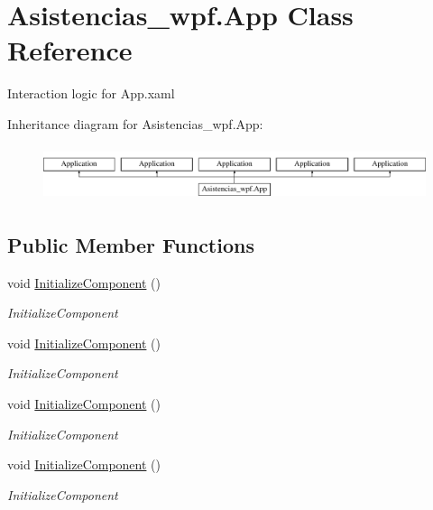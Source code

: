 \hypertarget{class_asistencias__wpf_1_1_app}{\section{Asistencias\-\_\-wpf.\-App Class Reference}
\label{class_asistencias__wpf_1_1_app}
}


Interaction logic for App.\-xaml  


Inheritance diagram for Asistencias\-\_\-wpf.\-App\-:\begin{figure}[H]
\begin{center}
\leavevmode
\includegraphics[height=1.623188cm]{da/d53/class_asistencias__wpf_1_1_app}
\end{center}
\end{figure}
\subsection*{Public Member Functions}
\begin{DoxyCompactItemize}
\item 
void \hyperlink{class_asistencias__wpf_1_1_app_a4b956655a7d184cd7528fae0982fd447}{Initialize\-Component} ()
\begin{DoxyCompactList}\small\item\em Initialize\-Component \end{DoxyCompactList}\item 
void \hyperlink{class_asistencias__wpf_1_1_app_a4b956655a7d184cd7528fae0982fd447}{Initialize\-Component} ()
\begin{DoxyCompactList}\small\item\em Initialize\-Component \end{DoxyCompactList}\item 
void \hyperlink{class_asistencias__wpf_1_1_app_a4b956655a7d184cd7528fae0982fd447}{Initialize\-Component} ()
\begin{DoxyCompactList}\small\item\em Initialize\-Component \end{DoxyCompactList}\item 
void \hyperlink{class_asistencias__wpf_1_1_app_a4b956655a7d184cd7528fae0982fd447}{Initialize\-Component} ()
\begin{DoxyCompactList}\small\item\em Initialize\-Component \end{DoxyCompactList}\end{DoxyCompactItemize}

